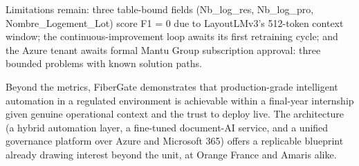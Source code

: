 Limitations remain: three table-bound fields (Nb\_log\_res, Nb\_log\_pro, Nombre\_Logement\_Lot) score F1 = 0 due to LayoutLMv3's 512-token context window; the continuous-improvement loop awaits its first retraining cycle; and the Azure tenant awaits formal Mantu Group subscription approval: three bounded problems with known solution paths.

Beyond the metrics, FiberGate demonstrates that production-grade intelligent automation in a regulated environment is achievable within a final-year internship given genuine operational context and the trust to deploy live. The architecture (a hybrid automation layer, a fine-tuned document-AI service, and a unified governance platform over Azure and Microsoft 365) offers a replicable blueprint already drawing interest beyond the unit, at Orange France and Amaris alike.
